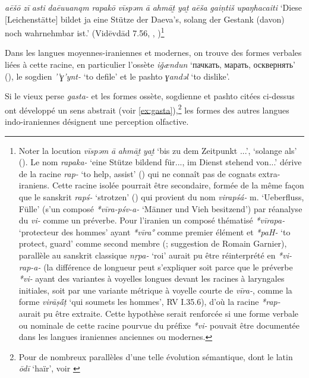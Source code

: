 \documentclass[11pt]{article}
\newcommand{\ipa}[1]{{\phon\textit{#1}}}
\newcommand{\forme}[1]{{\phon#1}}
\begin{document}
\begin{exe}
\ex \label{ex:gantish}
\glt 
\ipa{aēšō} \ipa{zī} \ipa{asti} \ipa{daēuuanąm} \ipa{rapakō} \ipa{vīspəm} \ipa{ā} \ipa{ahmāt̰} \ipa{yat̰} \ipa{aēša} \ipa{gaiṇtiš} \ipa{upaŋhacaiti}
\glt `Diese [Leichenstätte] bildet ja eine Stütze der Daeva's, solang der Gestank (davon) noch wahrnehmbar ist.' (Vidēvdād 7.56, \citealt[1741]{bartholomae1904altiranisches}, \citealt[363]{wolff1910avesta})\footnote{Noter la locution \ipa{vīspəm} \ipa{ā} \ipa{ahmāt̰} \ipa{yat̰} `bis zu dem Zeitpunkt ...', `solange als' (\citealt[1466]{bartholomae1904altiranisches}). Le nom \ipa{rapaka-} `eine Stütze bildend für..., im Dienst stehend von...' dérive de la racine \ipa{rap-} ‘to help, assist’ (\citealt[314]{cheung07dictionary}) qui ne connaît pas de cognats extra-iraniens. Cette racine isolée pourrait être secondaire, formée de la même façon que le sanskrit \ipa{rapś-} `strotzen' (\citealt[II:559]{mayrhofer92ewa}) %
qui provient du nom \ipa{virapśá-} m. `Ueberfluss, Fülle' (s'un composé \ipa{*vīra-pśv-a-} `Männer und Vieh besitzend') par réanalyse du \ipa{vi-} comme un préverbe. Pour l'iranien un composé thématisé \ipa{*vīrapa-} `protecteur des hommes' ayant \ipa{*vīra°} comme premier élément et \ipa{*paH-} `to protect, guard' comme second membre (\citealt[288]{cheung07dictionary}; suggestion de Romain Garnier), parallèle au sanskrit classique \ipa{nṛpa-} `roi' aurait pu être réinterprété en \ipa{*vi-rap-a-} (la différence de longueur peut s'expliquer soit parce que le préverbe \ipa{*vi-} ayant des variantes à voyelles longues devant les racines à laryngales initiales, soit par une variante métrique à voyelle courte de \ipa{vīra-}, comme la forme \ipa{virāṣā́ṭ} `qui soumets les hommes', RV I.35.6), d'où la racine \ipa{*rap-} aurait pu être extraite. Cette hypothèse serait renforcée si une forme verbale ou nominale de cette racine pourvue du préfixe \ipa{*vi-} pouvait être documentée dans les langues iraniennes anciennes ou modernes.
}
\end{exe}

Dans les langues moyennes-iraniennes et modernes, on trouve des formes verbales liées à cette racine, en particulier l'ossète \ipa{iǧændun} `\forme{пачкать, марать, осквернять}' (\citealt[542]{abaev58vol1}), le sogdien \ipa{’’ɣ’ynt-} ‘to defile’ et le pashto \ipa{ɣandəl} ‘to dislike'.


Si le vieux perse \ipa{gasta-} et les formes ossète, sogdienne et pashto citées ci-dessus ont développé un sens abstrait (voir \ref{ex:gasta}),\footnote{Pour de nombreux parallèles d'une telle évolution sémantique, dont le latin \ipa{ōdī} `haïr', voir \citet[55-59]{garnier10vocalisme}
} les formes des autres langues indo-iraniennes désignent une perception olfactive. 
\end{document}
